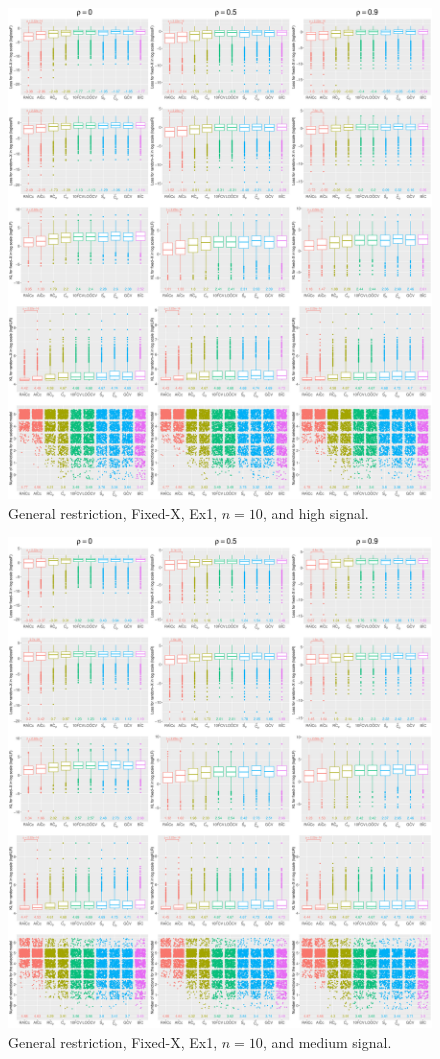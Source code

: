 \begin{figure}[!ht]
\centering
\includegraphics[width=\textwidth]{figures/supplement/fixedx/general_restriction/Ex1_n10_hsnr.eps}
\caption{General restriction, Fixed-X, Ex1, $n=10$, and high signal.}
\end{figure}
\clearpage
\begin{figure}[!ht]
\centering
\includegraphics[width=\textwidth]{figures/supplement/fixedx/general_restriction/Ex1_n10_msnr.eps}
\caption{General restriction, Fixed-X, Ex1, $n=10$, and medium signal.}
\end{figure}
